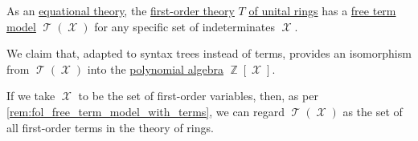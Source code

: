\begin{proposition}\label{thm:integer_polynomials_and_logical_terms}
  As an \hyperref[def:fol_equational_theory]{equational theory}, the \hyperref[def:fol_theory]{first-order theory} \( T \) \hyperref[def:ring/theory]{of unital rings} has a \hyperref[def:fol_free_term_model]{free term model} \( \mscrT(\mscrX) \) for any specific set of indeterminates \( \mscrX \).

  We claim that, adapted to syntax trees instead of terms,  provides an isomorphism from \( \mscrT(\mscrX) \) into the \hyperref[def:polynomial_algebra]{polynomial algebra} \( \BbbZ[\mscrX] \).
\end{proposition}
\begin{comments}
  \item If we take \( \mscrX \) to be the set of first-order variables, then, as per \cref{rem:fol_free_term_model_with_terms}, we can regard \( \mscrT(\mscrX) \) as the set of all first-order terms in the theory of rings.
\end{comments}
